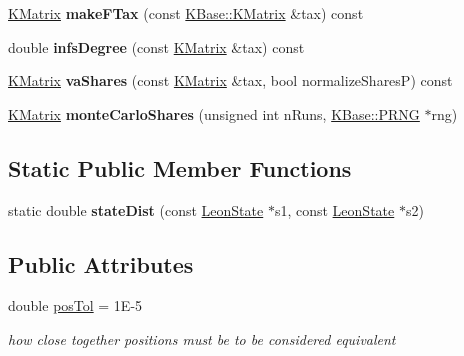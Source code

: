 \begin{DoxyCompactItemize}
\item 
\hypertarget{class_demo_leon_1_1_leon_model_a19b0b95e96472589423854fb825a67f2}{\hyperlink{class_k_base_1_1_k_matrix}{K\-Matrix} {\bfseries make\-F\-Tax} (const \hyperlink{class_k_base_1_1_k_matrix}{K\-Base\-::\-K\-Matrix} \&tax) const }\label{class_demo_leon_1_1_leon_model_a19b0b95e96472589423854fb825a67f2}

\item 
\hypertarget{class_demo_leon_1_1_leon_model_af1676ba2228e7d6a0b96dfeef5349e0c}{double {\bfseries infs\-Degree} (const \hyperlink{class_k_base_1_1_k_matrix}{K\-Matrix} \&tax) const }\label{class_demo_leon_1_1_leon_model_af1676ba2228e7d6a0b96dfeef5349e0c}

\item 
\hypertarget{class_demo_leon_1_1_leon_model_a30ad79a5b30a96f767c4590d19438407}{\hyperlink{class_k_base_1_1_k_matrix}{K\-Matrix} {\bfseries va\-Shares} (const \hyperlink{class_k_base_1_1_k_matrix}{K\-Matrix} \&tax, bool normalize\-Shares\-P) const }\label{class_demo_leon_1_1_leon_model_a30ad79a5b30a96f767c4590d19438407}

\item 
\hypertarget{class_demo_leon_1_1_leon_model_a8ce35fe7efdd8ec3b99f8912d76df45c}{\hyperlink{class_k_base_1_1_k_matrix}{K\-Matrix} {\bfseries monte\-Carlo\-Shares} (unsigned int n\-Runs, \hyperlink{class_k_base_1_1_p_r_n_g}{K\-Base\-::\-P\-R\-N\-G} $\ast$rng)}\label{class_demo_leon_1_1_leon_model_a8ce35fe7efdd8ec3b99f8912d76df45c}

\end{DoxyCompactItemize}
\subsection*{Static Public Member Functions}
\begin{DoxyCompactItemize}
\item 
\hypertarget{class_demo_leon_1_1_leon_model_a61157058f596312006f981d4751e601e}{static double {\bfseries state\-Dist} (const \hyperlink{class_demo_leon_1_1_leon_state}{Leon\-State} $\ast$s1, const \hyperlink{class_demo_leon_1_1_leon_state}{Leon\-State} $\ast$s2)}\label{class_demo_leon_1_1_leon_model_a61157058f596312006f981d4751e601e}

\end{DoxyCompactItemize}
\subsection*{Public Attributes}
\begin{DoxyCompactItemize}
\item 
\hypertarget{class_demo_leon_1_1_leon_model_ac38e9bf87f216341c4224975a36afad8}{double \hyperlink{class_demo_leon_1_1_leon_model_ac38e9bf87f216341c4224975a36afad8}{pos\-Tol} = 1\-E-\/5}\label{class_demo_leon_1_1_leon_model_ac38e9bf87f216341c4224975a36afad8}

\begin{DoxyCompactList}\small\item\em how close together positions must be to be considered equivalent \end{DoxyCompactList}\end{DoxyCompactItemize}
